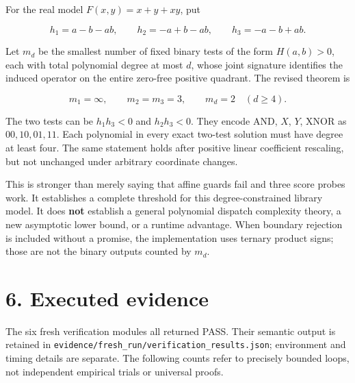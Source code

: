 \documentclass[
  11pt,
]{article}
\begin{document}
For the real model \(F(x,y)=x+y+xy\), put

\[h_1=a-b-ab,\qquad h_2=-a+b-ab,\qquad h_3=-a-b+ab.\]

Let \(m_d\) be the smallest number of fixed binary tests of the form
\(H(a,b)>0\), each with total polynomial degree at most \(d\), whose
joint signature identifies the induced operator on the entire zero-free
positive quadrant. The revised theorem is

\[m_1=\infty,\qquad m_2=m_3=3,\qquad m_d=2\quad(d\ge4).\]

The two tests can be \(h_1h_3<0\) and \(h_2h_3<0\). They encode AND,
\(X\), \(Y\), XNOR as \(00,10,01,11\). Each polynomial in every exact
two-test solution must have degree at least four. The same statement
holds after positive linear coefficient rescaling, but not unchanged
under arbitrary coordinate changes.

This is stronger than merely saying that affine guards fail and three
score probes work. It establishes a complete threshold for this
degree-constrained library model. It does \textbf{not} establish a
general polynomial dispatch complexity theory, a new asymptotic lower
bound, or a runtime advantage. When boundary rejection is included
without a promise, the implementation uses ternary product signs; those
are not the binary outputs counted by \(m_d\).

\section{6. Executed evidence}\label{executed-evidence}

The six fresh verification modules all returned PASS. Their semantic
output is retained in
\texttt{evidence/fresh\_run/verification\_results.json}; environment and
timing details are separate. The following counts refer to precisely
bounded loops, not independent empirical trials or universal proofs.
\end{document}
